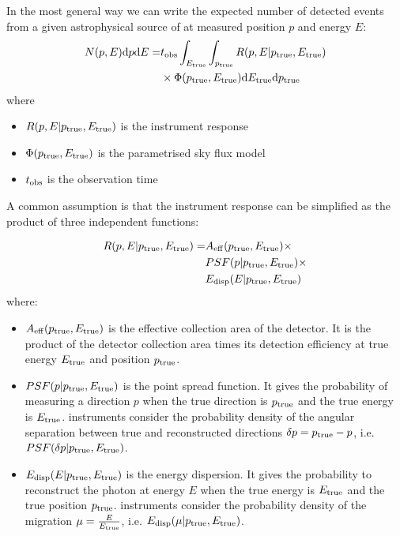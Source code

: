 \documentclass[traditabstract, longauth]{aa}
\begin{document}
In the most general way we can write the expected number of detected events from a given astrophysical source
of \gammaray at measured position $p$ and energy $E$:
\begin{align}
   N(p, E) {\rm d}p {\rm d}E = &t_{\rm obs} \int_{E_{\rm true}} \int_{p_{\rm true}}  R(p, E|p_{\rm true}, E_{\rm true})\\
   &\times \Phi(p_{\rm true}, E_{\rm true}) {\rm d}E_{\rm true} {\rm d}p_{\rm true}
\end{align}
where
\begin{itemize}
\item $R(p, E| p_{\rm true}, E_{\rm true})$ is the instrument response
\item $\Phi(p_{\rm true}, E_{\rm true})$ is the parametrised sky flux model
\item $t_{\rm obs}$ is the observation time
\end{itemize}

A common assumption is that the instrument response can be simplified as the product
of three independent functions:

\begin{align}
   R(p, E|p_{\rm true}, E_{\rm true}) = &A_{\rm eff}(p_{\rm true}, E_{\rm true}) \times\\
    &PSF(p|p_{\rm true}, E_{\rm true}) \times\\
    &E_{\rm disp}(E|p_{\rm true}, E_{\rm true})
\end{align}
where:
\begin{itemize}
\item $A_{\rm eff}(p_{\rm true}, E_{\rm true})$ is the effective collection area of the detector. It is the product
  of the detector collection area times its detection efficiency at true energy $E_{\rm true}$ and position $p_{\rm true}$.
\item $PSF(p|p_{\rm true}, E_{\rm true})$ is the point spread function. It gives the probability of
  measuring a direction $p$ when the true direction is $p_{\rm true}$ and the true energy is $E_{\rm true}$.
  \gammaray instruments consider the probability density of the angular separation between true and reconstructed directions
  $\delta p = p_{\rm true} - p$, i.e. $PSF(\delta p|p_{\rm true}, E_{\rm true})$.
\item $E_{\rm disp}(E|p_{\rm true}, E_{\rm true})$ is the energy dispersion. It gives the probability to
  reconstruct the photon at energy $E$ when the true energy is $E_{\rm true}$ and the true position $p_{\rm true}$.
  \gammaray instruments consider the probability density of the migration $\mu=\frac{E}{E_{\rm true}}$,
  i.e. $E_{\rm disp}(\mu|p_{\rm true}, E_{\rm true})$.
\end{itemize}
\end{document}
